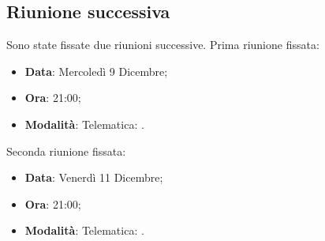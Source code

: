 \documentclass[]{article}
\begin{document}
		\subsection{Riunione successiva}
		Sono state fissate due riunioni successive.
		Prima riunione fissata:
		\begin{itemize}
			\item \textbf{Data}: Mercoledì 9 Dicembre;
			\item \textbf{Ora}: 21:00;
			\item \textbf{Modalità}: Telematica: .
		\end{itemize}
		Seconda riunione fissata:
		\begin{itemize}
			\item \textbf{Data}: Venerdì 11 Dicembre;
			\item \textbf{Ora}: 21:00;
			\item \textbf{Modalità}: Telematica: .
		\end{itemize}
\end{document}
